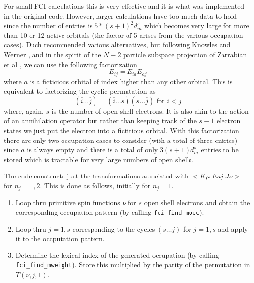 \documentclass[fullpage,12pt,fleqn]{article}
\begin{document}
For small FCI calculations this is very effective and it is what was
implemented in the original code. However, larger calculations have
too much data to hold since the number of entries is $5*(s+1)^2d^s_m$
which becomes very large for more than 10 or 12 active orbitals (the
factor of 5 arises from the various occupation cases).  Duch
recommended various alternatives, but following Knowles and Werner
\cite{knowleseai}, and in the spirit of the $N-2$ particle subspace
projection of Zarrabian et al \cite{zarrabian,harrison}, we can use the
following factorization
\begin{equation}
 E_{ij} = E_{ia}E_{aj}
\end{equation}
where $a$ is a ficticious orbital of index higher than any other
orbital.  This is equivalent to factorizing the cyclic permutation as 
\begin{equation}
(\overline{i} \ldots \overline{j}) = (\overline{i} \ldots s)(s \ldots
\overline{j}) \mbox{\ for\ } i < j
\end{equation}
where, again, $s$ is the number of open shell electrons.  It is also
akin to the action of an annihilation operator but rather than keeping
track of the $s-1$ electron states we just put the electron into a
fictitious orbital.  With this factorization there are only two
occupation cases to consider (with a total of three entries) since $a$
is always empty and there is a total of only $3(s+1)d^s_m$ entries to
be stored which is tractable for very large numbers of open shells.

The code constructs just the transformations associated with $<\!
K\mu|Eaj|J\nu\! >$ for $n_j=1,2$.  This is done as follows, initially
for $n_j = 1$.
\begin{enumerate}
\item Loop thru primitive spin functions $\nu$ for $s$ open shell
electrons and obtain the corresponding occupation pattern (by calling
\verb!fci_find_mocc!).

\item Loop thru $j=1,s$ corresponding to the cycles $(s \ldots j)$ for
$j=1,s$ and apply it to the occputation pattern.

\item Determine the lexical index of the generated occupation (by
calling \verb!fci_find_mweight!).  Store this multiplied by the parity
of the permutation in $T(\nu,j,1)$.
\end{enumerate}
\end{document}
